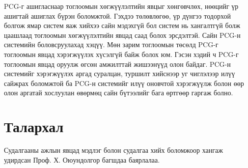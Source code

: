\quad PCG-г ашигласнаар тоглоомын хөгжүүлэлтийн явцыг хөнгөвчлөх, нөөцийг үр ашигтай ашиглах бүрэн боломжтой. Гэхдээ төлөвлөгөө, үр дүнгээ тодорхой болгож ямар систем яаж хийхээ сайн мэдэхгүй бол систем нь хангалтгүй болж цаашлаад тоглоомын хөгжүүлэлтийн явцад саад болох эрсдэлтэй. Сайн PCG-н системийн боловсруулахад хэцүү. Мөн зарим тоглоомын төсөлд PCG-г тоглоомын явцад хэрэгжүүлэх хүсэлгүй байж болох юм. Гэсэн хэдий ч PCG-г тоглоомын явцад оруулж өгсөн амжилттай жишээнүүд олон байдаг. PCG-н системийг хэрэгжүүлэх аргад суралцан, туршилт хийснээр уг чиглэлээр илүү сайжрах боломжтой ба PCG-н системийг илүү оновчтой хэрэгжүүлж болон өөр олон аргатай хослуулан өвөрмөц сайн бүтээлийг бага өртгөөр гаргаж болно.

\section*{Талархал}
Судалгааны ажлын явцад мэдлэг болон судалгаа хийх боломжоор хангаж удирдсан Проф. Х. Оюундолгор багшдаа баярлалаа.